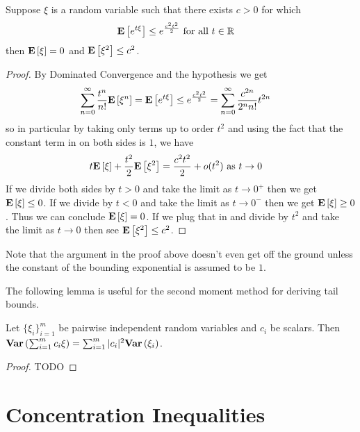 \begin{lem}Suppose $\xi$ is a random variable such that there exists
  $c>0$ for which
\begin{align*}
\textbf{E}\left[e^{t\xi}\right] &\leq e^{\frac{c^2 t^2}{2}} \text{ for all $t \in \mathbb{R}$}
\end{align*}
then $\textbf{E}\left[\xi\right]=0$ and $\textbf{E}\left[\xi^2\right] \leq c^2$.
\end{lem}
\begin{proof}
By Dominated Convergence and the hypothesis we get
\begin{align*}
\sum_{n=0}^\infty \frac{t^n}{n!}\textbf{E}\left[\xi^n\right] &=
\textbf{E}\left[e^{t\xi}\right] \leq e^{\frac{c^2 t^2}{2}} = \sum_{n=0}^\infty
\frac{c^{2n}}{2^n n!}t^{2n}
\end{align*}
so in particular by taking only terms up to order $t^2$ and using the
fact that the constant term in on both sides is $1$, we have
\begin{align*}
t \textbf{E}\left[\xi\right] + \frac{t^2}{2} \textbf{E}\left[\xi^2\right] &= \frac{c^2 t^2}{2}
+
o(t^2) \text { as $t \to 0$}
\end{align*}
If we divide both sides by $t > 0$ and take the limit as $t \to 0^+$ then we
get $\textbf{E}\left[\xi\right] \leq 0$.  If we divide by $t < 0$ and take the
limit as $t \to 0^-$ then we get $\textbf{E}\left[\xi\right] \geq 0$.  Thus we
can conclude $\textbf{E}\left[\xi\right] = 0$.  If we plug that in and divide
by $t^2$ and take the limit as $t \to 0$ then see $\textbf{E}\left[\xi^2\right]
\leq c^2$.
\end{proof}
Note that the argument in the proof above doesn't even get off the
ground unless the constant of the bounding exponential is assumed to
be $1$.

The following lemma is useful for the second moment method for
deriving tail bounds.
\begin{lem}Let $\{\xi_i\}_{i=1}^m$ be pairwise independent random
  variables and $c_i$ be scalars.  Then $\textbf{Var} \left (\sum_{i=1}^m c_i \xi \right ) =
  \sum_{i=1}^m |c_i|^2\textbf{Var} \left (\xi_i \right )$.
\end{lem}
\begin{proof}
TODO
\end{proof}

\section{Concentration Inequalities}

